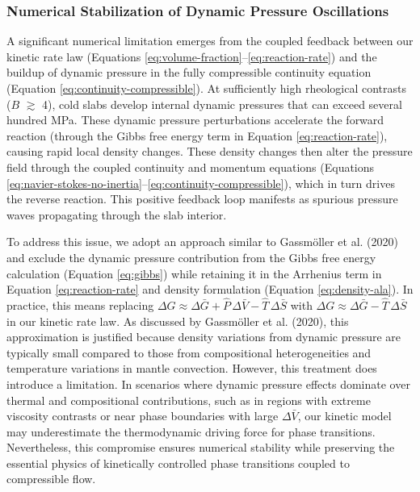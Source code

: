 \documentclass[draft,linenumbers]{agujournal2019}
\begin{document}
\subsubsection{Numerical Stabilization of Dynamic Pressure
Oscillations}\label{sec:numerical-stability}

A significant numerical limitation emerges from the coupled feedback
between our kinetic rate law (Equations
\ref{eq:volume-fraction}--\ref{eq:reaction-rate}) and the buildup of
dynamic pressure in the fully compressible continuity equation (Equation
\ref{eq:continuity-compressible}). At sufficiently high rheological
contrasts (\(B\) \(\gtrsim\) 4), cold slabs develop internal dynamic
pressures that can exceed several hundred MPa. These dynamic pressure
perturbations accelerate the forward reaction (through the Gibbs free
energy term in Equation \ref{eq:reaction-rate}), causing rapid local
density changes. These density changes then alter the pressure field
through the coupled continuity and momentum equations (Equations
\ref{eq:navier-stokes-no-inertia}--\ref{eq:continuity-compressible}),
which in turn drives the reverse reaction. This positive feedback loop
manifests as spurious pressure waves propagating through the slab
interior.

To address this issue, we adopt an approach similar to Gassmöller et al.
(2020) and exclude the dynamic pressure contribution from the Gibbs free
energy calculation (Equation \ref{eq:gibbs}) while retaining it in the
Arrhenius term in Equation \ref{eq:reaction-rate} and density
formulation (Equation \ref{eq:density-ala}). In practice, this means
replacing
\(\Delta G \approx \Delta \bar{G} + \hat{P}\, \Delta \bar{V} - \hat{T}\, \Delta \bar{S}\)
with \(\Delta G \approx \Delta \bar{G} - \hat{T}\, \Delta \bar{S}\) in
our kinetic rate law. As discussed by Gassmöller et al. (2020), this
approximation is justified because density variations from dynamic
pressure are typically small compared to those from compositional
heterogeneities and temperature variations in mantle convection.
However, this treatment does introduce a limitation. In scenarios where
dynamic pressure effects dominate over thermal and compositional
contributions, such as in regions with extreme viscosity contrasts or
near phase boundaries with large \(\Delta \bar{V}\), our kinetic model
may underestimate the thermodynamic driving force for phase transitions.
Nevertheless, this compromise ensures numerical stability while
preserving the essential physics of kinetically controlled phase
transitions coupled to compressible flow.
\end{document}
